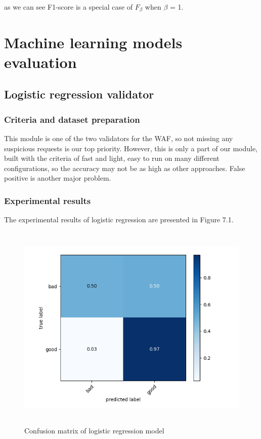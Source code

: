 as we can see F1-score is a special case of $F_\beta$ when $\beta$ = 1.

\section{Machine learning models evaluation}
\label{sec:model_evaluation}

\subsection{Logistic regression validator}
\subsubsection{Criteria and dataset preparation}
\hspace{0.5cm}This module is one of the two validators for the WAF, so not missing any suspicious requests is our top priority. However, this is only a part of our module, built with the criteria of fast and light, easy to run on many different configurations, so the accuracy may not be as high as other approaches. False positive is another major problem. 

\newpage
\subsubsection{Experimental results}
\hspace{0.5cm}The experimental results of logistic regression are presented in Figure 7.1.

\begin{figure}[!h]
	\centering
	\includegraphics[width=\linewidth, height=10cm,keepaspectratio]{figures/confusion logistic.png}
  \caption{Confusion matrix of logistic regression model}
\end{figure}

